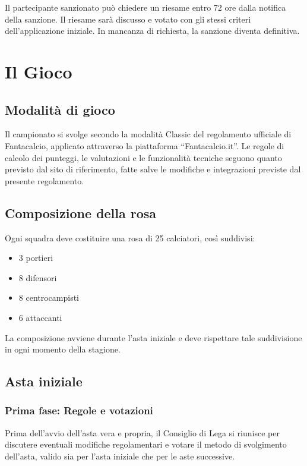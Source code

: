 Il partecipante sanzionato può chiedere un riesame entro 72 ore dalla notifica della sanzione. Il riesame sarà discusso e votato con gli stessi criteri dell’applicazione iniziale. In mancanza di richiesta, la sanzione diventa definitiva.


\chapter{Il Gioco}
\label{cap:il-gioco}

\section{Modalità di gioco}
\label{art:4.1}

Il campionato si svolge secondo la modalità Classic del regolamento ufficiale di Fantacalcio, applicato attraverso la piattaforma “Fantacalcio.it”. Le regole di calcolo dei punteggi, le valutazioni e le funzionalità tecniche seguono quanto previsto dal sito di riferimento, fatte salve le modifiche e integrazioni previste dal presente regolamento.

\section{Composizione della rosa}
\label{art:4.2}

\noindent
Ogni squadra deve costituire una rosa di 25 calciatori, così suddivisi:

\begin{itemize}
  \item 3 portieri
  \item 8 difensori
  \item 8 centrocampisti
  \item 6 attaccanti
\end{itemize}

\noindent
La composizione avviene durante l’asta iniziale e deve rispettare tale suddivisione in ogni momento della stagione.

\section{Asta iniziale}
\label{art:4.3}

\subsection{Prima fase: Regole e votazioni}
\label{art:4.3.1}

Prima dell’avvio dell’asta vera e propria, il Consiglio di Lega si riunisce per discutere eventuali modifiche regolamentari e votare il metodo di svolgimento dell’asta, valido sia per l’asta iniziale che per le aste successive.

